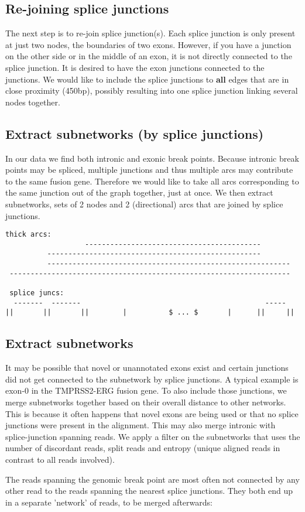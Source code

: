 \documentclass{article}
\theoremstyle{definition}
\begin{document}
\subsection{Re-joining splice junctions}
The next step is to re-join splice junction(s).
Each splice junction is only present at just two nodes, the boundaries of two exons.
However, if you have a junction on the other side or in the middle of an exon, it is not directly connected to the splice junction.
It is desired to have the exon junctions connected to the junctions.
We would like to include the splice junctions to \textbf{all} edges that are in close proximity (450bp), possibly resulting into one splice junction linking several nodes together.

\subsection{Extract subnetworks (by splice junctions)}
In our data we find both intronic and exonic break points.
Because intronic break points may be spliced, multiple junctions and thus multiple arcs may contribute to the same fusion gene.
Therefore we would like to take all arcs corresponding to the same junction out of the graph together, just at once.
We then extract subnetworks, sets of 2 nodes and 2 (directional) arcs that are joined by splice junctions.

\begin{verbatim}
thick arcs:
                   ------------------------------------------
          ---------------------------------------------------
          ----------------------------------------------------------
 -------------------------------------------------------------------

 splice juncs:
  -------  -------                                            -----
||       ||       ||        |          $ ... $       |      ||     ||

\end{verbatim}



\subsection{Extract subnetworks}
It may be possible that novel or unannotated exons exist and certain junctions did not get connected to the subnetwork by splice junctions.
A typical example is exon-0 in the TMPRSS2-ERG fusion gene.
To also include those junctions, we merge subnetworks together based on their overall distance to other networks.
This is because it often happens that novel exons are being used or that no splice junctions were present in the alignment.
This may also merge intronic with splice-junction spanning reads.
We apply a filter on the subnetworks that uses the number of discordant reads, split reads and entropy (unique aligned reads in contrast to all reads involved).

The reads spanning the genomic break point are most often not connected by any other read to the reads spanning the nearest splice junctions.
They both end up in a separate 'network' of reads, to be merged afterwards:
\end{document}
